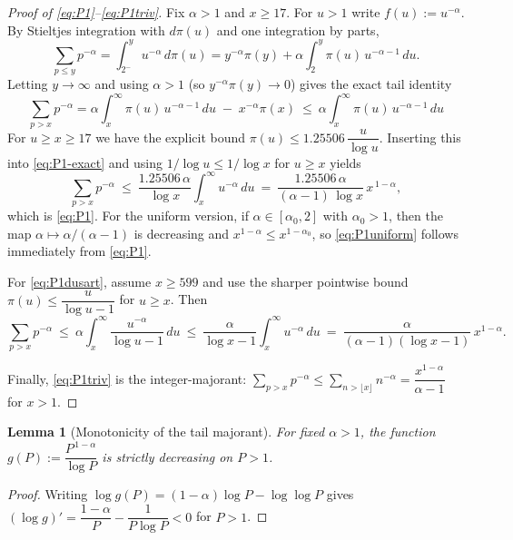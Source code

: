 \documentclass[11pt]{article}
\newtheorem{lemma}[theorem]{Lemma}
\theoremstyle{definition}
\theoremstyle{remark}
\theoremstyle{definition}
\begin{document}
\begin{proof}[Proof of \eqref{eq:P1}--\eqref{eq:P1triv}]
Fix $\alpha>1$ and $x\ge 17$. For $u>1$ write $f(u):=u^{-\alpha}$. By Stieltjes integration with $d\pi(u)$ and one integration by parts,
\[
\sum_{p\le y} p^{-\alpha}
=\int_{2^-}^{y} u^{-\alpha}\,d\pi(u)
= y^{-\alpha}\pi(y)+\alpha\!\int_{2}^{y} \pi(u)\,u^{-\alpha-1}\,du.
\]
Letting $y\to\infty$ and using $\alpha>1$ (so $y^{-\alpha}\pi(y)\to 0$) gives the exact tail identity
\begin{equation}\label{eq:P1-exact}
\sum_{p>x} p^{-\alpha}
=\alpha\!\int_{x}^{\infty}\!\pi(u)\,u^{-\alpha-1}\,du\;-\;x^{-\alpha}\pi(x)
\ \le\ \alpha\!\int_{x}^{\infty}\!\pi(u)\,u^{-\alpha-1}\,du
\end{equation}
For $u\ge x\ge 17$ we have the explicit bound $\pi(u)\le 1.25506\,\dfrac{u}{\log u}$. Inserting this into \eqref{eq:P1-exact} and using $1/\log u\le 1/\log x$ for $u\ge x$ yields
\[
\sum_{p>x} p^{-\alpha}
\ \le\ \frac{1.25506\,\alpha}{\log x}\!\int_{x}^{\infty}\!u^{-\alpha}\,du
\ =\ \frac{1.25506\,\alpha}{(\alpha-1)\,\log x}\,x^{\,1-\alpha},
\]
which is \eqref{eq:P1}. For the uniform version, if $\alpha\in[\alpha_0,2]$ with $\alpha_0>1$, then the map $\alpha\mapsto \alpha/(\alpha-1)$ is decreasing and $x^{1-\alpha}\le x^{1-\alpha_0}$, so \eqref{eq:P1uniform} follows immediately from \eqref{eq:P1}.

For \eqref{eq:P1dusart}, assume $x\ge 599$ and use the sharper pointwise bound $\pi(u)\le \dfrac{u}{\log u-1}$ for $u\ge x$. Then
\[
\sum_{p>x} p^{-\alpha}
\ \le\ \alpha\!\int_{x}^{\infty}\!\frac{u^{-\alpha}}{\log u-1}\,du
\ \le\ \frac{\alpha}{\log x-1}\!\int_{x}^{\infty}\!u^{-\alpha}\,du
\ =\ \frac{\alpha}{(\alpha-1)(\log x-1)}\,x^{1-\alpha}.
\]

Finally, \eqref{eq:P1triv} is the integer-majorant: $\sum_{p>x}p^{-\alpha}\le \sum_{n>\lfloor x\rfloor}n^{-\alpha}=\dfrac{x^{1-\alpha}}{\alpha-1}$ for $x>1$.
\end{proof}

\begin{lemma}[Monotonicity of the tail majorant]\label{lem:P1-monotone}
For fixed $\alpha>1$, the function $g(P):=\dfrac{P^{\,1-\alpha}}{\log P}$ is strictly decreasing on $P>1$.
\end{lemma}
\begin{proof}
Writing $\log g(P)=(1-\alpha)\log P-\log\log P$ gives
$(\log g)'=\dfrac{1-\alpha}{P}-\dfrac{1}{P\log P}<0$ for $P>1$.
\end{proof}
\end{document}
